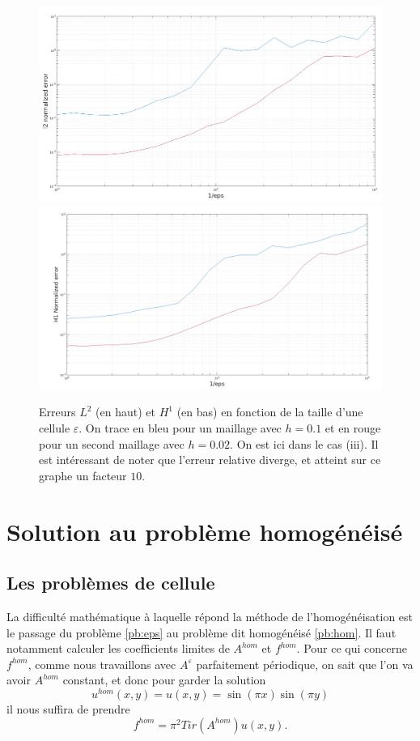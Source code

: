 \documentclass[11pt]{article}
\newcommand{\Ah}{A^{hom}}
\newcommand{\uh}{u^{hom}}
\newcommand{\fh}{f^{hom}}
\begin{document}
\begin{figure}
  \centering
  \includegraphics[height=.25\textheight]{SolutionExacte/err_L2_eps} 
  \includegraphics[height=.25\textheight]{SolutionExacte/err_H1_eps}   
  \caption{Erreurs $L^2$ (en haut) et $H^1$ (en bas) en fonction de la taille d'une cellule $\varepsilon$. On trace en bleu pour un maillage avec
    $h=0.1$ et en rouge pour un second maillage avec $h=0.02$. On est ici dans le cas (iii). Il est intéressant de noter que l'erreur relative
    diverge, et atteint sur ce graphe un facteur $10$.}
  \label{fig:err_eps}
\end{figure}
\section{Solution au problème homogénéisé}

\subsection{Les problèmes de cellule}

La difficulté mathématique à laquelle répond la méthode de l'homogénéisation est le passage du problème \ref{pb:eps} au problème dit homogénéisé
\ref{pb:hom}. Il faut notamment calculer les coefficients limites de $\Ah$ et $\fh$. Pour ce qui concerne $\fh$, comme nous travaillons avec
$A^\varepsilon$ parfaitement périodique, on sait que l'on va avoir $\Ah$ constant, et donc pour garder la solution
\[
  \uh(x, y) = u(x, y) = \sin(\pi x)\sin(\pi y)
\]
il nous suffira de prendre
\[
  \fh = \pi^2 Tir(\Ah) u(x, y).
\]
\end{document}
